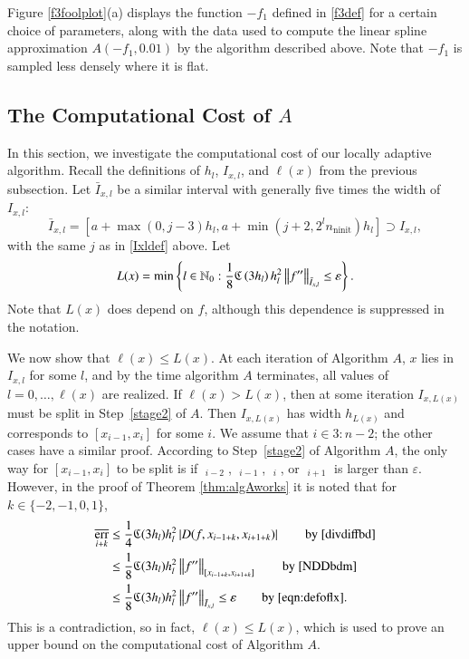\documentclass[review]{elsarticle}
\newcommand{\abstol}{\varepsilon}
\theoremstyle{definition}
\newcommand{\Ixl}{I_{x,l}}
\DeclareMathOperator{\ninit}{ninit}
\DeclareMathOperator{\oerr}{\overline{err}}
\begin{document}
Figure \ref{f3foolplot}(a) displays the function $-f_1$ defined in
\eqref{f3def} for a certain choice of parameters, along with the data used to
compute the linear spline approximation $A(-f_1,0.01)$ by the algorithm
described above. Note that $-f_1$ is sampled less densely where it is flat.


\subsection{The Computational Cost of $A$} \label{subsec:appxcost}

In this section, we investigate the computational cost of our locally adaptive
algorithm. Recall the definitions of $h_l$, $\Ixl$, and $\ell(x)$ from the
previous subsection. Let
$\bar{I}_{x,l}$ be a similar interval with generally five times the
width of~$\Ixl$:
\begin{equation}
\bar{I}_{x,l}=\left[a+\max(0,j-3)h_l, a+ \min(j+2,2^l n_{\ninit})h_l\right] \supset \Ixl,
\end{equation}
with the same $j$ as in \eqref{Ixldef} above.  Let
\begin{equation}\label{eqn:defoflx}
L(x) = \min \left\{ l \in \mathbb{N}_0 :  \frac{1}{8} \fC\left(3h_l\right)h_l^2\norm[\bar{I}_{x,l}]{f''} \le \abstol \right\}.
\end{equation}
Note that $L(x)$ does depend on $f$, although this dependence is suppressed in
the notation.

We now show that $\ell(x) \le L(x)$. At each iteration of Algorithm $A$, $x$
lies in $\Ixl$ for some $l$, and by the time algorithm $A$ terminates, all
values of $l = 0, \ldots, \ell(x)$ are realized. If $\ell(x) > L(x)$, then at
some iteration $I_{x,L(x)}$ must be split in Step~\ref{stage2} of $A$. Then
$I_{x,L(x)}$ has width $h_{L(x)}$ and corresponds to $[x_{i-1},x_i]$ for some
$i$. We assume that $i \in 3\!:\!n-2$; the other cases have a similar proof.
According to Step~\ref{stage2} of Algorithm $A$, the only way for
$[x_{i-1},x_i]$ to be split is if $\oerr_{i-2}$, $\oerr_{i-1}$, $\oerr_{i}$, or
$\oerr_{i+1}$ is larger than $\abstol$. However, in the proof of Theorem
\ref{thm:algAworks} it is noted that for $k \in \{-2, -1, 0, 1\}$,
\begin{align}
\nonumber
\oerr_{i+k} & \le \frac{1}4 \fC(3h_l) h_l^2 \abs{D(f,x_{i-1+k},x_{i+1+k})} \qquad \text{by \eqref{divdiffbd}} \\
\nonumber
& \le \frac{1} 8 \fC(3h_l) h_l^2 \norm[{[x_{i-1+k},x_{i+1+k}]}]{f''}  \qquad \text{by \eqref{NDDbdm}}\\
& \le \frac{1} 8 \fC(3h_l) h_l^2 \norm[\bar{I}_{x,l}]{f''} \le \varepsilon \qquad \text{by \eqref{eqn:defoflx}}. \label{oerrbd}
\end{align}
This is a contradiction, so in fact, $\ell(x) \le L(x)$, which is used to prove an upper bound on the
computational cost of Algorithm $A$.
\end{document}
